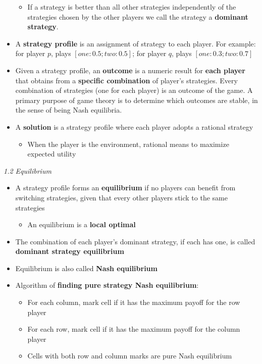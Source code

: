 \documentclass[12pt]{article}
\begin{document}
\begin{itemize}
\begin{itemize}
  
 \item If a strategy is better than all other strategies independently of the strategies chosen
by the other players we call the strategy a \textbf{dominant strategy}.

 \end{itemize}
 
 \item A \textbf{strategy profile} is an assignment of strategy to each player. For example: for player $p$, plays $[one: 0.5; two: 0.5]$; for player $q$, plays $[one: 0.3; two: 0.7]$

\item Given a strategy profile, an \textbf{outcome} is a numeric result for \textbf{each player} that obtains from a \textbf{specific combination} of player's strategies. Every combination of strategies (one for each player) is an outcome of the game. A primary purpose of game theory is to determine which outcomes are stable, in the sense of being Nash equilibria.

\item A \textbf{solution} is a strategy profile where each player adopts a rational strategy
 \begin{itemize}
 \item When the player is the environment, rational means to maximize expected utility
 \end{itemize}
\end{itemize}

\noindent
\textsl{1.2 Equilibrium}

\begin{itemize}
\item A strategy profile forms an \textbf{equilibrium} if no players can benefit from switching strategies, given that every other players stick to the same strategies
\begin{itemize}
\item An equilibrium is a \textbf{local optimal}
\end{itemize}
\item The combination of each player's dominant strategy, if each has one, is called \textbf{dominant strategy equilibrium}
\item Equilibrium is also called \textbf{Nash equilibrium}
\item Algorithm of \textbf{finding pure strategy Nash equilibrium}:
\begin{itemize}
\item For each column, mark cell if it has the maximum payoff for the row player
\item For each row, mark cell if it has the maximum payoff for the column player
\item Cells with both row and column marks are pure Nash equilibrium
\end{itemize}

\end{itemize}
\end{document}
